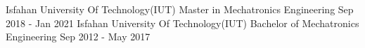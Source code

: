 \begin{cventries}
  \cventry
    {Isfahan University Of Technology(IUT)} %
    {Master in Mechatronics Engineering} %
    {} %
    {Sep 2018 - Jan 2021} %
    {}
  \cventry
    {Isfahan University Of Technology(IUT)} %
    {Bachelor of Mechatronics Engineering} %
    {} %
    {Sep 2012 - May 2017} %
    {}
    
\end{cventries}
